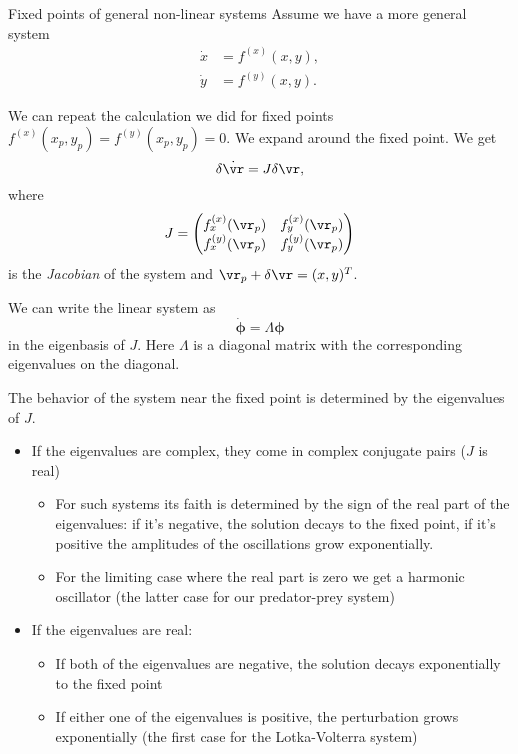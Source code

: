 \begin{frame}{Fixed points of general non-linear systems}
	Assume we have a more general system
	\[ 
	\begin{split}
		\dot{x} &= f^{(x)}(x,y), \\
		\dot{y} &= f^{(y)}(x,y).
	\end{split}
	\]
	
	\pause
	We can repeat the calculation we did for fixed points $ f^{(x)}(x_{p},y_{p}) = f^{(y)}(x_p,y_p) = 0 $. We expand around the fixed point. We get 
	\[  
	\delta \dot{\vr} = J \delta  \vr,
	\]
	where 
	\[ 
	J = \begin{pmatrix}
		f^{(x)}_x(\vr_p) & f^{(x)}_y(\vr_p) \\
		f^{(y)}_x(\vr_p) & f^{(y)}_y(\vr_p)
	\end{pmatrix}
	\]
	is the \emph{Jacobian} of the system and $ \vr_{p} + \delta \vr = (x,y)^T $.
\end{frame}

\begin{frame}
	We can write the linear system as 
	\[  
	\dot{\bm{\phi}} = \Lambda \bm{\phi}
	\]
	in the eigenbasis of $ J $. Here $ \Lambda $ is a diagonal matrix with the corresponding eigenvalues on the diagonal. 
	
	\pause
	The behavior of the system near the fixed point is determined by the eigenvalues of $ J $. 
	\begin{itemize}
		\item If the eigenvalues are complex, they come in complex conjugate pairs ($ J $ is real)
		\begin{itemize}
			\item For such systems its faith is determined by the sign of the real part of the eigenvalues: if it's negative, the solution decays to the fixed point, if it's positive the amplitudes of the oscillations grow exponentially. 
			\item For the limiting case where the real part is zero we get a harmonic oscillator (the latter case for our predator-prey system)
		\end{itemize}
		\item If the eigenvalues are real:
		\begin{itemize}
			\item If both of the eigenvalues are negative, the solution decays exponentially to the fixed point
			\item If either one of the eigenvalues is positive, the perturbation grows exponentially (the first case for the Lotka-Volterra system)
		\end{itemize}
	\end{itemize}
\end{frame}

